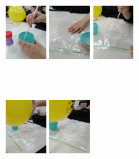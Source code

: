 \documentclass[]{article}
\newenvironment{Figura}
  {\par\medskip\noindent\minipage{\linewidth}}
  {\endminipage\par\medskip}
\begin{document}
\begin{multicols*}{2}[\setlength{columnsep}{3cm}]
\begin{Figura}
    \centering
    \includegraphics[width=1.5cm, height=3cm]{imag/Exp2_00.jpg}
    \includegraphics[width=1.5cm, height=3cm]{imag/Exp2_01.jpg}
    \includegraphics[width=1.5cm, height=3cm]{imag/Exp2_02.jpg}
\end{Figura}  

\begin{Figura}
    \centering
    \includegraphics[width=1.5cm, height=3cm]{imag/Exp2_03.jpg}
    \includegraphics[width=1.5cm, height=3cm]{imag/Exp2_04.jpg}
\end{Figura}   





    

\end{multicols*}
\end{document}
